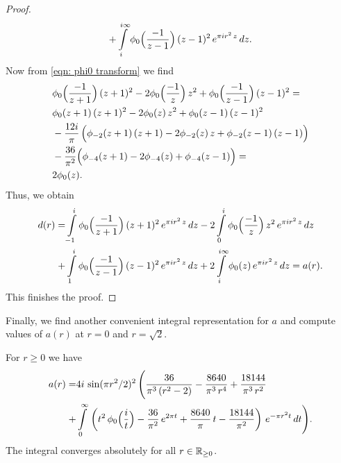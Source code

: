 \begin{proof}
\begin{align}
  +\int\limits_{i}^{i\infty}\phi_0\Big(\frac{-1}{z-1}\Big)\,(z-1)^2\,e^{\pi i r^2 \,z}\,dz.\notag
\end{align}
Now from \eqref{eqn: phi0 transform} we find
\begin{align}&\phi_0\Big(\frac{-1}{z+1}\Big)\,(z+1)^2-2\phi_0\Big(\frac{-1}{z}\Big)\,z^2+
\phi_0\Big(\frac{-1}{z-1}\Big)\,(z-1)^2=\notag\\
&\phi_0(z+1)\,(z+1)^2-2\phi_0(z)\,z^2+\phi_0(z-1)\,(z-1)^2\notag\\
&-\frac{12i}{\pi}\,\Big(\phi_{-2}(z+1)\,(z+1)-2\phi_{-2}(z)\,z+\phi_{-2}(z-1)\,(z-1)\Big)\notag\\
&-\frac{36}{\pi^2}\Big(\phi_{-4}(z+1)-2\phi_{-4}(z)+\phi_{-4}(z-1)\Big)=\notag\\
&2\phi_0(z).
  \end{align}
  Thus, we obtain
  \begin{align}
  d(r)=&\int\limits_{-1}^{i}\phi_0\Big(\frac{-1}{z+1}\Big)\,(z+1)^2\,e^{\pi i r^2 \,z}\,dz
  -2\int\limits_{0}^{i}\phi_0\Big(\frac{-1}{z}\Big)\,z^2\,e^{\pi i r^2 \,z}\,dz\notag\\
  +&\int\limits_{1}^{i}\phi_0\Big(\frac{-1}{z-1}\Big)\,(z-1)^2\,e^{\pi i r^2 \,z}\,dz
  +2\int\limits_{i}^{i\infty}\phi_0(z)\,e^{\pi i r^2 \,z}\,dz=a(r).\notag
\end{align}
This finishes the proof.
\end{proof}
Finally, we find another convenient integral representation for $a$ and compute values of $a(r)$ at $r=0$ and $r=\sqrt{2}$.
\begin{proposition}\label{prop: a another integral}
For $r\geq0$ we have
\begin{align}\label{eqn: a another integral}a(r)=&4i\,\sin(\pi r^2/2)^2\,\Bigg(\frac{36}{\pi^3\,(r^2-2)}-\frac{8640}{\pi^3\,r^4}+\frac{18144}{\pi^3\,r^2}\\ +&\int\limits_0^\infty\,\left(t^2\,\phi_0\Big(\frac{i}{t}\Big)-\frac{36}{\pi^2}\,e^{2\pi t}+\frac{8640}{\pi}\,t-\frac{18144}{\pi^2}\right)\,e^{-\pi r^2 t}\,dt \Bigg) .\notag\end{align}
The integral converges absolutely for all $r\in\mathbb{R}_{\geq 0}$.
\end{proposition}
